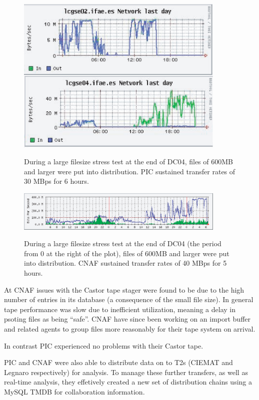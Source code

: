 \documentclass{cmspaper}
\begin{document}
\begin{figure}[tbp]
\centering
\includegraphics[width=10cm]{PIC-stress.eps}
\label{fig:PIC-stress}
\caption{During a large filesize stress test at the end of DC04, files of 600MB and larger were put into distribution. PIC sustained transfer rates of 30 MBps for 6 hours.}
\end{figure} 

\begin{figure}[tbp]
\centering
\includegraphics[width=10cm]{CNAF-stress.eps}
\label{fig:CNAF-stress}
\caption{During a large filesize stress test at the end of DC04 (the period from 0 at the right of the plot), files of 600MB and larger were put into distribution. CNAF sustained transfer rates of 40 MBps for 5 hours.}
\end{figure} 

At CNAF issues with the Castor tape stager were found to be due to the high number of entries in its database (a consequence of the small file size). In general tape performance was slow due to inefficient utilization, meaning a delay in psoting files as being ``safe''. CNAF have since been working on an import buffer and related agents to group files more reasonably for their tape system on arrival.

In contrast PIC experienced no problems with their Castor tape.

PIC and CNAF were also able to distribute data on to T2s (CIEMAT and Legnaro respectively) for analysis. To manage these further transfers, as well as real-time analysis, they effetively created a new set of distribution chains using a MySQL TMDB for collaboration information.
\end{document}
